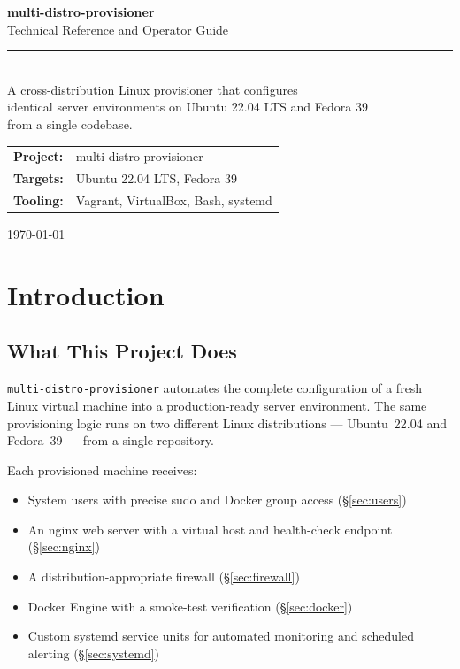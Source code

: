 \documentclass[11pt,a4paper]{article}
\begin{document}
\begin{titlepage}
\centering
\vspace*{2.5cm}
{\fontsize{28}{32}\selectfont\bfseries\sffamily multi-distro-provisioner}\\[0.6cm]
{\large\sffamily Technical Reference and Operator Guide}\\[2.2cm]
\rule{0.7\textwidth}{0.4pt}\\[1.2cm]
{\normalsize
A cross-distribution Linux provisioner that configures\\
identical server environments on Ubuntu 22.04 LTS and Fedora 39\\
from a single codebase.
}\\[2cm]
\begin{tabular}{ll}
  \textbf{Project:}  & multi-distro-provisioner \\[4pt]
  \textbf{Targets:}  & Ubuntu 22.04 LTS, Fedora 39 \\[4pt]
  \textbf{Tooling:}  & Vagrant, VirtualBox, Bash, systemd \\[4pt]
\end{tabular}
\vfill
{\small\sffamily\today}
\end{titlepage}

\tableofcontents
\newpage

\section{Introduction}
\label{sec:intro}

\subsection{What This Project Does}

\texttt{multi-distro-provisioner} automates the complete configuration of a fresh Linux virtual machine into a production-ready server environment. The same provisioning logic runs on two different Linux distributions — Ubuntu~22.04 and Fedora~39 — from a single repository.

Each provisioned machine receives:

\begin{itemize}
  \item System users with precise sudo and Docker group access (\S\ref{sec:users})
  \item An nginx web server with a virtual host and health-check endpoint (\S\ref{sec:nginx})
  \item A distribution-appropriate firewall (\S\ref{sec:firewall})
  \item Docker Engine with a smoke-test verification (\S\ref{sec:docker})
  \item Custom systemd service units for automated monitoring and scheduled alerting (\S\ref{sec:systemd})
\end{itemize}
\end{document}
